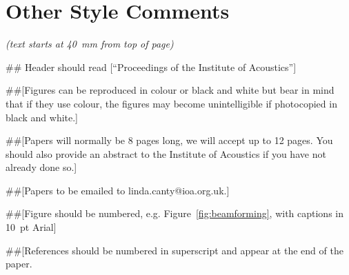 \documentclass[10pt, a4paper, oneside]{article}
\begin{document}
\section{Other Style Comments}

\textit{(text starts at 40~mm from top of page)}

\#\# Header should read [``Proceedings of the Institute of Acoustics'']

\#\#[Figures can be reproduced in colour or black and white but bear in mind that if they use colour, the figures may become unintelligible if photocopied in black and white.]

\#\#[Papers will normally be 8 pages long, we will accept up to 12 pages. You should also provide an abstract to the Institute of Acoustics if you have not already done so.]

\#\#[Papers to be emailed to linda.canty@ioa.org.uk.]

\#\#[Figure should be numbered, e.g. Figure~\ref{fig:beamforming}, with captions in 10~pt Arial]

\#\#[References should be numbered in superscript and appear at the end of the paper\cite{Mareze-2019,Steeneken,cox2001extracting,Haykin,arial}.


\renewcommand{\refname}{References} \renewcommand{\bibname}{References} 


%
%
\end{document}
